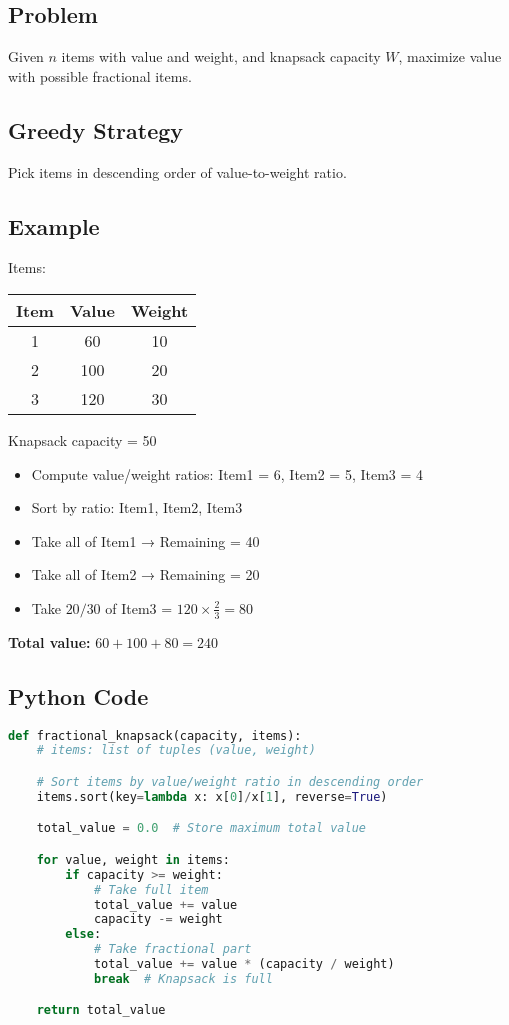 \documentclass[14pt]{extarticle}
\begin{document}
\subsection*{Problem}
Given $n$ items with value and weight, and knapsack capacity $W$, maximize value with possible fractional items.

\subsection*{Greedy Strategy}
Pick items in descending order of value-to-weight ratio.

\subsection*{Example}

Items:

\begin{center}
\begin{tabular}{|c|c|c|}
\hline
Item & Value & Weight \\
\hline
1 & 60 & 10 \\
2 & 100 & 20 \\
3 & 120 & 30 \\
\hline
\end{tabular}
\end{center}

Knapsack capacity = 50

\newpage

\begin{itemize}
    \item Compute value/weight ratios:  
    Item1 = 6, Item2 = 5, Item3 = 4
    \item Sort by ratio: Item1, Item2, Item3
    \item Take all of Item1 → Remaining = 40
    \item Take all of Item2 → Remaining = 20
    \item Take $20/30$ of Item3 = $120 \times \frac{2}{3} = 80$
\end{itemize}

\textbf{Total value:} $60 + 100 + 80 = 240$

\subsection*{Python Code}
\begin{lstlisting}[language=Python]
def fractional_knapsack(capacity, items):
    # items: list of tuples (value, weight)

    # Sort items by value/weight ratio in descending order
    items.sort(key=lambda x: x[0]/x[1], reverse=True)

    total_value = 0.0  # Store maximum total value

    for value, weight in items:
        if capacity >= weight:
            # Take full item
            total_value += value
            capacity -= weight
        else:
            # Take fractional part
            total_value += value * (capacity / weight)
            break  # Knapsack is full

    return total_value
\end{lstlisting}
\end{document}
